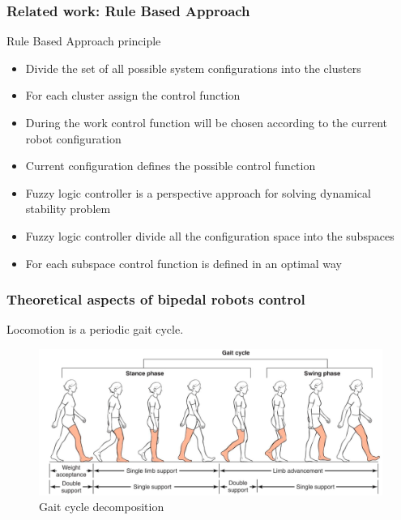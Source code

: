 \documentclass{beamer}
\begin{document}

	\begin{frame}
		\frametitle{Related work: Rule Based Approach}
		\begin{block}{Rule Based Approach principle}
			\begin{itemize}
				\item
					Divide the set of all possible system configurations into the clusters
				\item 
					For each cluster assign the control function
				\item During the work control function will be chosen according to the current robot configuration
				\item
					Current configuration defines the possible control function
				\item Fuzzy logic controller is a perspective approach for solving dynamical stability problem
				\item Fuzzy logic controller divide all the configuration space into the subspaces
				\item For each subspace control function is defined in an optimal way
			\end{itemize}
		\end{block}
	\end{frame}


	\begin{frame}
		\frametitle{Theoretical aspects of bipedal robots control}
		\centering
		Locomotion is a periodic gait cycle.
		
		\begin{figure}[h!]
			\begin{minipage}[H]{\linewidth}
				\includegraphics[width=\linewidth]{presentation_images/26}
				\caption{Gait cycle decomposition \cite{gait}}
			\end{minipage}
		\end{figure}
	\end{frame}
	
\end{document}
